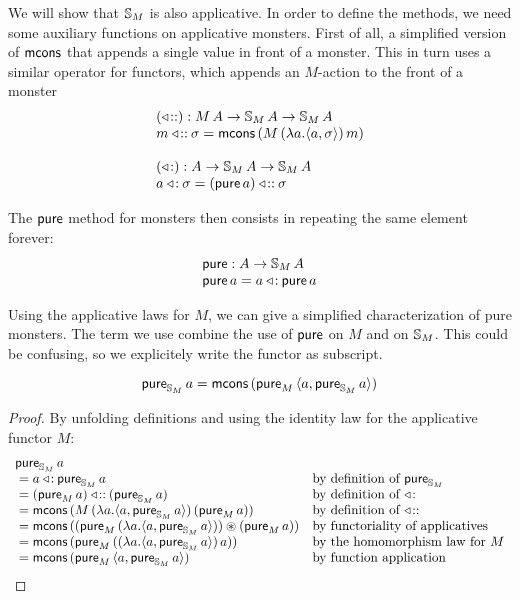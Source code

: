 We will show that $\mathbb{S}_{M}$ is also applicative.
In order to define the methods, we need some auxiliary functions on applicative monsters.
First of all, a simplified version of $\mathsf{mcons}$ that appends a single value in front of a monster.
This in turn uses a similar operator for functors, which appends an $M$-action to the front of a monster
$$
\begin{array}{l}
(\mathbin{\triangleleft\!::}): M\,A \rightarrow \mathbb{S}_{M}\,A \rightarrow \mathbb{S}_{M}\,A\\
m \mathbin{\triangleleft\!::} \sigma = \mathsf{mcons}\, (M\,(\lambda a. \langle a, \sigma\rangle)\,m)\\
\,\\
(\mathbin{\triangleleft\!:}): A \rightarrow \mathbb{S}_{M}\,A \rightarrow \mathbb{S}_{M}\,A\\
a \mathbin{\triangleleft\!:} \sigma = (\mathsf{pure}\, a) \mathbin{\triangleleft\!::} \sigma
\end{array}
$$

The $\mathsf{pure}$ method for monsters then consists in repeating the same element forever:
$$
\begin{array}{l}
\mathsf{pure} : A \rightarrow \mathbb{S}_{M}\,A\\
\mathsf{pure}\,a = a \mathbin{\triangleleft\!:} \mathsf{pure}\,a
\end{array}
$$

Using the applicative laws for $M$, we can give a simplified characterization of pure monsters.
The term we use combine the use of $\mathsf{pure}$ on $M$ and on $\mathbb{S}_{M}$.
This could be confusing, so we explicitely write the functor as subscript.
\begin{lemma}\label{lemma:monster_pure}
$$
\mathsf{pure}_{\mathbb{S}_{M}}\,a = \mathsf{mcons}\,(\mathsf{pure}_M\,\langle a, \mathsf{pure}_{\mathbb{S}_{M}}\,a\rangle)
$$
\end{lemma}
\begin{proof}
By unfolding definitions and using the identity law for the applicative functor $M$:
$$
\begin{array}{ll}
\mathsf{pure}_{\mathbb{S}_{M}}\,a \\
{}= a \mathbin{\triangleleft\!:} \mathsf{pure}_{\mathbb{S}_{M}}\,a
  & \mbox{by definition of }\mathsf{pure}_{\mathbb{S}_{M}} \\
{}= (\mathsf{pure}_M\,a) \mathbin{\triangleleft\!::} (\mathsf{pure}_{\mathbb{S}_{M}}\,a)
  & \mbox{by definition of }\mathbin{\triangleleft\!:}\\
{}=  \mathsf{mcons}\, (M\,(\lambda a. \langle a, \mathsf{pure}_{\mathbb{S}_{M}}\,a\rangle)\,(\mathsf{pure}_M\,a))
  & \mbox{by definition of }\mathbin{\triangleleft\!::}\\
{}= \mathsf{mcons}\, ((\mathsf{pure}_M\,(\lambda a. \langle a, \mathsf{pure}_{\mathbb{S}_{M}}\,a\rangle)) \circledast (\mathsf{pure}_M\,a))
  & \mbox{by functoriality of applicatives}\\
{}= \mathsf{mcons}\, (\mathsf{pure}_M\,((\lambda a. \langle a, \mathsf{pure}_{\mathbb{S}_{M}}\,a\rangle)\,a))
  & \mbox{by the homomorphism law for }M\\
{}= \mathsf{mcons}\, (\mathsf{pure}_M\,\langle a, \mathsf{pure}_{\mathbb{S}_{M}}\,a\rangle)
  & \mbox{by function application}
\end{array}
$$
\end{proof}

